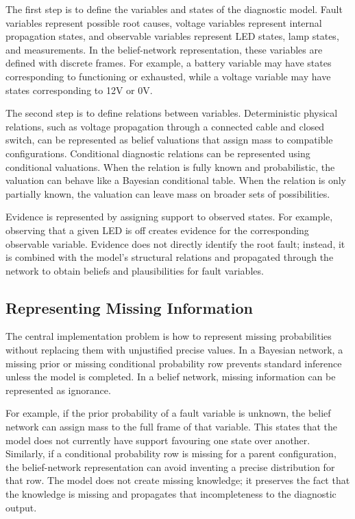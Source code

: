 \documentclass[runningheads]{llncs}
\begin{document}
The first step is to define the variables and states of the diagnostic model. Fault variables represent possible root causes, voltage variables represent internal propagation states, and observable variables represent LED states, lamp states, and measurements. In the belief-network representation, these variables are defined with discrete frames. For example, a battery variable may have states corresponding to functioning or exhausted, while a voltage variable may have states corresponding to 12V or 0V.

The second step is to define relations between variables. Deterministic physical relations, such as voltage propagation through a connected cable and closed switch, can be represented as belief valuations that assign mass to compatible configurations. Conditional diagnostic relations can be represented using conditional valuations. When the relation is fully known and probabilistic, the valuation can behave like a Bayesian conditional table. When the relation is only partially known, the valuation can leave mass on broader sets of possibilities.

Evidence is represented by assigning support to observed states. For example, observing that a given LED is off creates evidence for the corresponding observable variable. Evidence does not directly identify the root fault; instead, it is combined with the model's structural relations and propagated through the network to obtain beliefs and plausibilities for fault variables.

\subsection{Representing Missing Information}
\label{sec:representing_missing_information}

The central implementation problem is how to represent missing probabilities without replacing them with unjustified precise values. In a Bayesian network, a missing prior or missing conditional probability row prevents standard inference unless the model is completed. In a belief network, missing information can be represented as ignorance.

For example, if the prior probability of a fault variable is unknown, the belief network can assign mass to the full frame of that variable. This states that the model does not currently have support favouring one state over another. Similarly, if a conditional probability row is missing for a parent configuration, the belief-network representation can avoid inventing a precise distribution for that row. The model does not create missing knowledge; it preserves the fact that the knowledge is missing and propagates that incompleteness to the diagnostic output.
\end{document}
